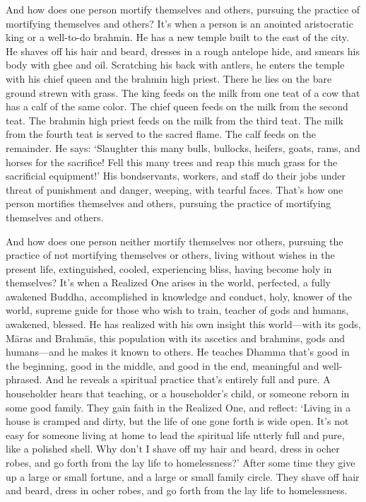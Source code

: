 \documentclass[12pt,openany]{book}%
\begin{document}
And how does one person mortify themselves and others, pursuing the practice of mortifying themselves and others? It’s when a person is an anointed aristocratic king or a well-to-do brahmin. He has a new temple built to the east of the city. He shaves off his hair and beard, dresses in a rough antelope hide, and smears his body with ghee and oil. Scratching his back with antlers, he enters the temple with his chief queen and the brahmin high priest. There he lies on the bare ground strewn with grass. The king feeds on the milk from one teat of a cow that has a calf of the same color. The chief queen feeds on the milk from the second teat. The brahmin high priest feeds on the milk from the third teat. The milk from the fourth teat is served to the sacred flame. The calf feeds on the remainder. He says: ‘Slaughter this many bulls, bullocks, heifers, goats, rams, and horses for the sacrifice! Fell this many trees and reap this much grass for the sacrificial equipment!’ His bondservants, workers, and staff do their jobs under threat of punishment and danger, weeping, with tearful faces. That’s how one person mortifies themselves and others, pursuing the practice of mortifying themselves and others. 

And how does one person neither mortify themselves nor others, pursuing the practice of not mortifying themselves or others, living without wishes in the present life, extinguished, cooled, experiencing bliss, having become holy in themselves? It’s when a Realized One arises in the world, perfected, a fully awakened Buddha, accomplished in knowledge and conduct, holy, knower of the world, supreme guide for those who wish to train, teacher of gods and humans, awakened, blessed. He has realized with his own insight this world—with its gods, \textsanskrit{Māras} and \textsanskrit{Brahmās}, this population with its ascetics and brahmins, gods and humans—and he makes it known to others. He teaches Dhamma that’s good in the beginning, good in the middle, and good in the end, meaningful and well-phrased. And he reveals a spiritual practice that’s entirely full and pure. A householder hears that teaching, or a householder’s child, or someone reborn in some good family. They gain faith in the Realized One, and reflect: ‘Living in a house is cramped and dirty, but the life of one gone forth is wide open. It’s not easy for someone living at home to lead the spiritual life utterly full and pure, like a polished shell. Why don’t I shave off my hair and beard, dress in ocher robes, and go forth from the lay life to homelessness?’ After some time they give up a large or small fortune, and a large or small family circle. They shave off hair and beard, dress in ocher robes, and go forth from the lay life to homelessness. 
\end{document}
